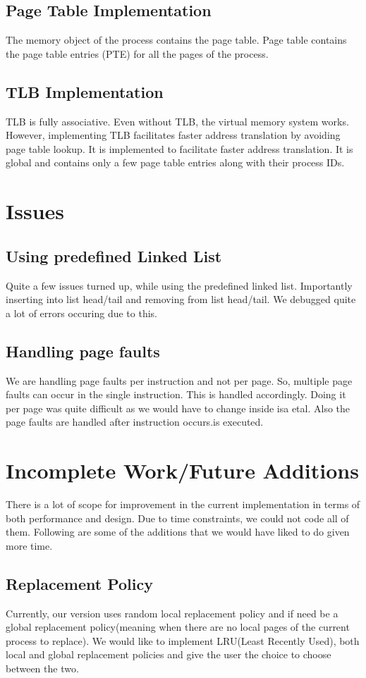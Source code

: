 \documentclass[paper=a4, fontsize=11pt,twoside]{scrartcl}   %
\begin{document}
\subsection{Page Table Implementation}
The memory object of the process contains the page table.  Page table contains the page table entries (PTE) for all the pages of the process. 
\subsection{TLB Implementation}
TLB is fully associative. Even without TLB, the virtual memory system works. However, implementing TLB facilitates faster address translation by avoiding page table lookup. It is implemented to facilitate faster address translation. It is global and contains only a few page table entries along with their process IDs. 


\section{Issues}
\subsection{Using predefined Linked List}
Quite a few issues turned up, while using the predefined linked list. Importantly inserting into list head/tail and removing from list head/tail. We debugged quite a lot of errors occuring due to this.
\subsection{Handling page faults}
We are handling page faults per instruction and not per page. So, multiple page faults can occur in the single instruction. This is handled accordingly. Doing it per page was quite difficult as we would have to change inside isa etal. Also the page faults are handled after instruction occurs.is executed. 


\newpage
\section{Incomplete Work/Future Additions}
 There is a lot of scope for improvement in the current implementation in terms of both performance and design. Due to time constraints, we could not code all of them.
 Following are some of the additions that we would have liked to do given more time.
   
   \subsection{Replacement Policy}
   Currently, our version uses random local replacement policy and if need be a global replacement policy(meaning when there are no local pages of the current process to replace). We would like to implement LRU(Least Recently Used), both local and global replacement policies and give the user the choice to choose between the two.
   
\end{document}
